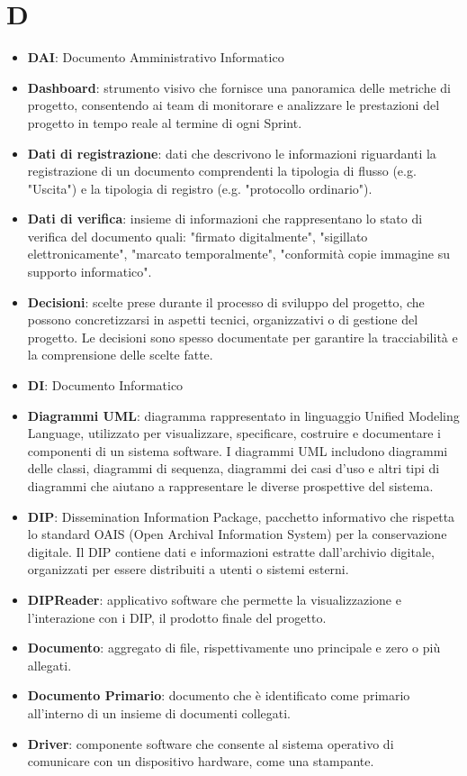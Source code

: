 \documentclass[a4paper,12pt]{article}
\begin{document}
\section{D}
\begin{itemize}
    \item \textbf{DAI}: Documento Amministrativo Informatico
    \item \textbf{Dashboard}: strumento visivo che fornisce una panoramica delle metriche di progetto, consentendo ai team di monitorare e analizzare le prestazioni del progetto in tempo reale al termine di ogni Sprint.
    \item \textbf{Dati di registrazione}: dati che descrivono le informazioni riguardanti la registrazione di un documento comprendenti la tipologia di flusso (e.g. "Uscita") e la tipologia di registro (e.g. "protocollo ordinario").
    \item \textbf{Dati di verifica}: insieme di informazioni che rappresentano lo stato di verifica del documento quali: "firmato digitalmente", "sigillato elettronicamente", "marcato temporalmente", "conformità copie immagine su supporto informatico".
    \item \textbf{Decisioni}: scelte prese durante il processo di sviluppo del progetto, che possono concretizzarsi in aspetti tecnici, organizzativi o di gestione del progetto. Le decisioni sono spesso documentate per garantire la tracciabilità e la comprensione delle scelte fatte.
    \item \textbf{DI}: Documento Informatico
    \item \textbf{Diagrammi UML}: diagramma rappresentato in linguaggio Unified Modeling Language, utilizzato per visualizzare, specificare, costruire e documentare i componenti di un sistema software. I diagrammi UML includono diagrammi delle classi, diagrammi di sequenza, diagrammi dei casi d'uso e altri tipi di diagrammi che aiutano a rappresentare le diverse prospettive del sistema.
    \item \textbf{DIP}: Dissemination Information Package, pacchetto informativo che rispetta lo standard OAIS (Open Archival Information System) per la conservazione digitale. Il DIP contiene dati e informazioni estratte dall'archivio digitale, organizzati per essere distribuiti a utenti o sistemi esterni.
    \item \textbf{DIPReader}: applicativo software che permette la visualizzazione e l'interazione con i DIP, il prodotto finale del progetto.
    \item \textbf{Documento}: aggregato di file, rispettivamente uno principale e zero o più allegati.
    \item \textbf{Documento Primario}: documento che è identificato come primario all'interno di un insieme di documenti collegati.
    \item \textbf{Driver}: componente software che consente al sistema operativo di comunicare con un dispositivo hardware, come una stampante.
\end{itemize}
\end{document}
